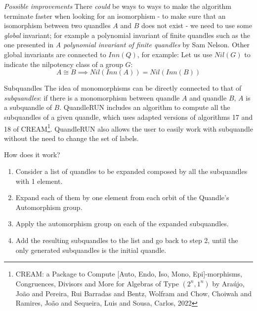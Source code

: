 \begin{frame}{\emph{Possible improvements}}
There \emph{could} be ways to ways to make the algorithm terminate faster when looking for an isomorphism - to make sure that an isomorphism between two quandles $A$ and $B$ does not exist - we need to use some \emph{global} invariant; for example a polynomial invariant of finite quandles such as the one presented in \textit{A polynomial invariant of finite quandles} by Sam Nelson.\newline\newline
Other global invariants are connected to $Inn(Q)$, for example: \newline\newline
Let us use $Nil(G)$ to indicate the nilpotency class of a group $G$:
\[A \cong B \implies Nil(Inn(A)) = Nil(Inn(B)) \]
\end{frame}

\begin{frame}{Subquandles}
The idea of monomorphisms can be directly connected to that of \emph{subquandles}: if there is a monomorphism between quandle $A$ and quandle $B$, $A$ is a subquandle of $B$. \newline \newline QuandleRUN includes an algorithm to compute all the subquandles of a given quandle, which uses adapted versions of algorithms 17 and 18 of CREAM\footnote{CREAM: a Package to Compute [Auto, Endo, Iso, Mono, Epi]-morphisms, Congruences, Divisors and More for Algebras of Type $(2^n, 1^n)$ by Ara{\'u}jo, Jo{\~a}o and Pereira, Rui Barradas and Bentz, Wolfram and Chow, Choiwah and Ramires, Jo{\~a}o and Sequeira, Luis and Sousa, Carlos, 2022\newline}.\newline
QuandleRUN also allows the user to easily work with subquandle without the need to change the set of labels.

\end{frame}
\begin{frame}{How does it work?}
    \begin{enumerate}
        \item Consider a list of quandles to be expanded composed by all the subquandles with 1 element. 
        \item Expand each of them by one element from each orbit of the Quandle's Automorphism group.
        \item Apply the automorphism group on each of the expanded subquandles.
        \item Add the resulting subquandles to the list and go back to step 2, until the only generated subquandles is the initial quandle.
        
    \end{enumerate}
\end{frame}


